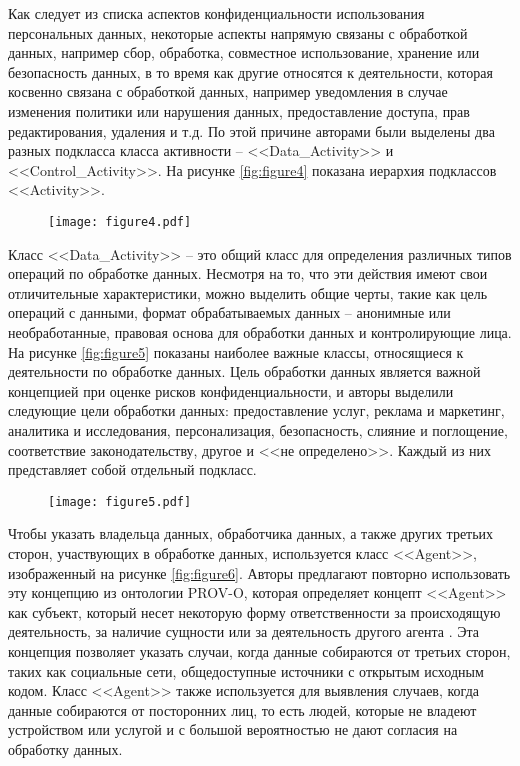 \documentclass[../main]{subfiles}
\begin{document}
Как следует из списка аспектов конфиденциальности использования персональных данных, некоторые аспекты напрямую связаны с обработкой данных, например сбор, обработка, совместное использование, хранение или безопасность данных, в то время как другие относятся к деятельности, которая косвенно связана с обработкой данных, например уведомления в случае изменения политики или нарушения данных, предоставление доступа, прав редактирования, удаления и т.д. По этой причине авторами были выделены два разных подкласса класса активности -- <<Data\_Activity>> и <<Control\_Activity>>. На рисунке \ref{fig:figure4} показана иерархия подклассов <<Activity>>. 

\begin{figure}[H]
    \centering
    {\texttt{[image: figure4.pdf]}}
    \vspace{-\baselineskip}
\end{figure}

Класс <<Data\_Activity>> -- это общий класс для определения различных типов операций по обработке данных. Несмотря на то, что эти действия имеют свои отличительные характеристики, можно выделить общие черты, такие как цель операций с данными, формат обрабатываемых данных -- анонимные или необработанные, правовая основа для обработки данных и контролирующие лица. На рисунке \ref{fig:figure5} показаны наиболее важные классы, относящиеся к деятельности по обработке данных. Цель обработки данных является важной концепцией при оценке рисков конфиденциальности, и авторы выделили следующие цели обработки данных: предоставление услуг, реклама и маркетинг, аналитика и исследования, персонализация, безопасность, слияние и поглощение, соответствие законодательству, другое и <<не определено>>. Каждый из них представляет собой отдельный подкласс.

\begin{figure}[H]
    \centering
    {\texttt{[image: figure5.pdf]}}
    \vspace{-\baselineskip}
\end{figure}

Чтобы указать владельца данных, обработчика данных, а также других третьих сторон, участвующих в обработке данных, используется класс <<Agent>>, изображенный на рисунке \ref{fig:figure6}. Авторы предлагают повторно использовать эту концепцию из онтологии PROV-O, которая определяет концепт <<Agent>> как субъект, который несет некоторую форму ответственности за происходящую деятельность, за наличие сущности или за деятельность другого агента \cite{MDPI22}. Эта концепция позволяет указать случаи, когда данные собираются от третьих сторон, таких как социальные сети, общедоступные источники с открытым исходным кодом. Класс <<Agent>> также используется для выявления случаев, когда данные собираются от посторонних лиц, то есть людей, которые не владеют устройством или услугой и с большой вероятностью не дают согласия на обработку данных. 
\end{document}
